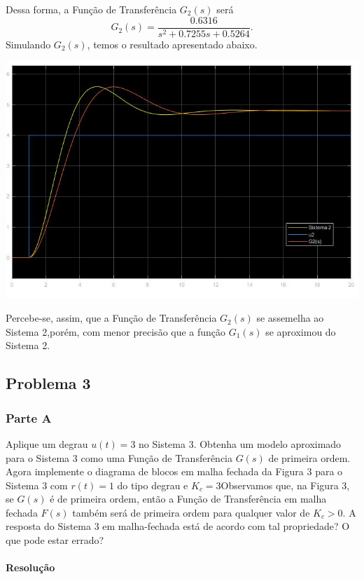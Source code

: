 \documentclass[
]{book}
\begin{document}
Dessa forma, a Função de Transferência \(G_2(s)\) será
\[
G_2(s) = \frac {0.6316}{s^2 + 0.7255s + 0.5264}.
\]
Simulando \(G_2(s)\), temos o resultado apresentado abaixo.

\includegraphics{Imagens/Lab3/Resolução/prob2B.jpg}

Percebe-se, assim, que a Função de Transferência \(G_2(s)\) se assemelha ao Sistema 2,porém, com menor precisão que a função \(G_1(s)\) se aproximou do Sistema 2.

\hypertarget{problema-3}{%
\subsection*{Problema 3}\label{problema-3}}

\hypertarget{parte-a}{%
\subsubsection*{Parte A}\label{parte-a}}

Aplique um degrau \(u(t) = 3\) no Sistema 3. Obtenha um modelo aproximado para o Sistema 3 como uma Função de Transferência \(G(s)\) de primeira ordem. Agora implemente o diagrama de blocos em malha fechada da Figura 3 para o Sistema 3 com \(r(t) = 1\) do tipo degrau e \(K_c = 3\)Observamos que, na Figura 3, se \(G(s)\) é de primeira ordem, então a Função de Transferência em malha fechada \(F(s)\) também será de primeira ordem para qualquer valor de \(K_c > 0\). A resposta do Sistema 3 em malha-fechada está de acordo com tal propriedade? O que pode estar errado?

\hypertarget{resoluuxe7uxe3o-2}{%
\paragraph*{Resolução}\label{resoluuxe7uxe3o-2}}
\end{document}
